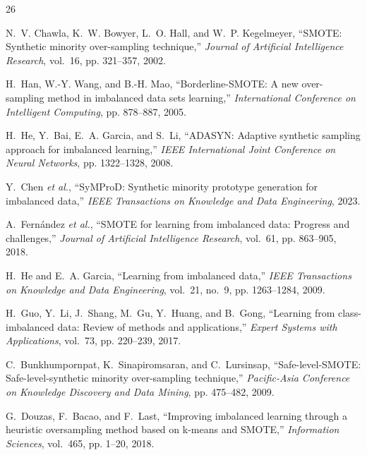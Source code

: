 \documentclass{ijSmartGrid}
\theoremstyle{definition}
\begin{document}

\begin{thebibliography}{26}

N.~V. Chawla, K.~W. Bowyer, L.~O. Hall, and W.~P. Kegelmeyer,
``SMOTE: Synthetic minority over-sampling technique,''
\emph{Journal of Artificial Intelligence Research}, vol.~16, pp. 321--357, 2002.

H.~Han, W.-Y. Wang, and B.-H. Mao,
``Borderline-SMOTE: A new over-sampling method in imbalanced data sets learning,''
\emph{International Conference on Intelligent Computing}, pp. 878--887, 2005.

H.~He, Y.~Bai, E.~A. Garcia, and S.~Li,
``ADASYN: Adaptive synthetic sampling approach for imbalanced learning,''
\emph{IEEE International Joint Conference on Neural Networks}, pp. 1322--1328, 2008.

Y.~Chen \emph{et al.},
``SyMProD: Synthetic minority prototype generation for imbalanced data,''
\emph{IEEE Transactions on Knowledge and Data Engineering}, 2023.

A.~Fern{\'a}ndez \emph{et al.},
``SMOTE for learning from imbalanced data: Progress and challenges,''
\emph{Journal of Artificial Intelligence Research}, vol.~61, pp. 863--905, 2018.

H.~He and E.~A. Garcia,
``Learning from imbalanced data,''
\emph{IEEE Transactions on Knowledge and Data Engineering}, vol.~21, no.~9, pp. 1263--1284, 2009.

H.~Guo, Y.~Li, J.~Shang, M.~Gu, Y.~Huang, and B.~Gong,
``Learning from class-imbalanced data: Review of methods and applications,''
\emph{Expert Systems with Applications}, vol.~73, pp. 220--239, 2017.

C.~Bunkhumpornpat, K.~Sinapiromsaran, and C.~Lursinsap,
``Safe-level-SMOTE: Safe-level-synthetic minority over-sampling technique,''
\emph{Pacific-Asia Conference on Knowledge Discovery and Data Mining}, pp. 475--482, 2009.

G.~Douzas, F.~Bacao, and F.~Last,
``Improving imbalanced learning through a heuristic oversampling method based on k-means and SMOTE,''
\emph{Information Sciences}, vol.~465, pp. 1--20, 2018.


\end{thebibliography}
\end{document}
